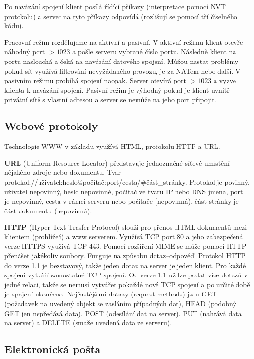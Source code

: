 Po navázání spojení klient posílá řídící příkazy (interpretace pomocí NVT protokolu) a server na tyto příkazy odpovídá (rozlišují se pomocí tří číselného kódu).

Pracovní režim rozdělujeme na aktivní a pasivní. V aktivní režimu klient otevře náhodný port $> 1023$ a pošle serveru vybrané číslo portu. Následně klient na portu naslouchá a čeká na navázání datového spojení. Můžou nastat problémy pokud síť využívá filtrování nevyžádaného provozu, je za NATem nebo další. V pasivním režimu probíhá spojení naopak. Server otevírá port $> 1023$ a vyzve klienta k navázání spojení. Pasivní režim je výhodný pokud je klient uvnitř privátní sítě s vlastní adresou a server se nemůže na jeho port připojit.

\subsection{Webové protokoly}

Technologie WWW v základu využívá HTML, protokolu HTTP a URL.

\textbf{URL} (Uniform Resource Locator) představuje jednoznačné síťové umístění nějakého zdroje nebo dokumentu. Tvar protokol://uživatel:heslo@počítač:port/cesta/\#část\_stránky. Protokol je povinný, uživatel nepovinný, heslo nepovinné, počítač ve tvaru IP nebo DNS jména, port je nepovinný, cesta v rámci serveru nebo počítače (nepovinná), část stránky je část dokumentu (nepovinná).

\textbf{HTTP} (Hyper Text Trasfer Protocol) slouží pro přenos HTML dokumentů mezi klientem (prohlížeč) a www serverem. Využívá TCP port 80 a jeho zabezpečená verze HTTPS využívá TCP 443. Pomocí rozšíření MIME se může pomocí HTTP přenášet jakékoliv soubory. Funguje na způsobu dotaz--odpověď. Protokol HTTP do verze 1.1 je bezstavový, takže jeden dotaz na server je jeden klient. Pro každé spojení vytváří samostatné TCP spojení. Od verze 1.1 už lze podat více dotazů v jedné relaci, takže se nemusí vytvářet pokaždé nové TCP spojení a po určité době je spojení ukončeno. Nejčastějšími dotazy (request methods) jsou GET (požadavek na uvedený objekt se zasláním případných dat), HEAD (podobný GET jen nepředává data), POST (odesílání dat na server), PUT (nahrává data na server) a DELETE (smaže uvedená data ze serveru).

\subsection{Elektronická pošta}

